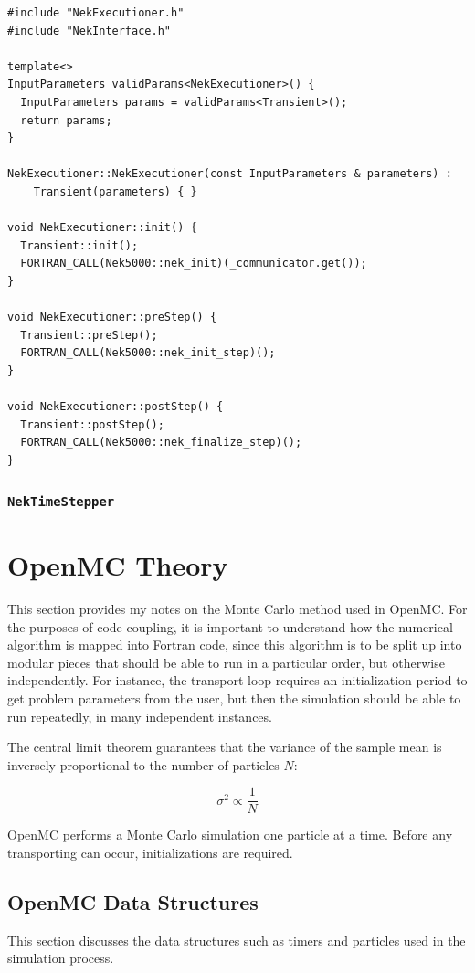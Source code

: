 \documentclass[10pt]{article}
\newcommand{\beq}{\begin{equation}}
\newcommand{\eeq}{\end{equation}}
\numberwithin{equation}{section} %
\begin{document}
\begin{lstlisting}
#include "NekExecutioner.h"
#include "NekInterface.h"

template<>
InputParameters validParams<NekExecutioner>() {
  InputParameters params = validParams<Transient>();
  return params;
}

NekExecutioner::NekExecutioner(const InputParameters & parameters) :
    Transient(parameters) { }

void NekExecutioner::init() {
  Transient::init();
  FORTRAN_CALL(Nek5000::nek_init)(_communicator.get());
}

void NekExecutioner::preStep() {
  Transient::preStep();
  FORTRAN_CALL(Nek5000::nek_init_step)();
}

void NekExecutioner::postStep() {
  Transient::postStep();
  FORTRAN_CALL(Nek5000::nek_finalize_step)();
}
\end{lstlisting}

\subsubsection{{\tt NekTimeStepper}}







\section{OpenMC Theory}
This section provides my notes on the Monte Carlo method used in OpenMC. For the purposes of code coupling, it is important to understand how the numerical algorithm is mapped into Fortran code, since this algorithm is to be split up into modular pieces that should be able to run in a particular order, but otherwise independently. For instance, the transport loop requires an initialization period to get problem parameters from the user, but then the simulation should be able to run repeatedly, in many independent instances. 

The central limit theorem guarantees that the variance of the sample mean is inversely proportional to the number of particles \(N\):

\beq
\sigma^2\propto\frac{1}{N}
\eeq

OpenMC performs a Monte Carlo simulation one particle at a time. Before any transporting can occur, initializations are required. 

\subsection{OpenMC Data Structures}
This section discusses the data structures such as timers and particles used in the simulation process. 
\end{document}
